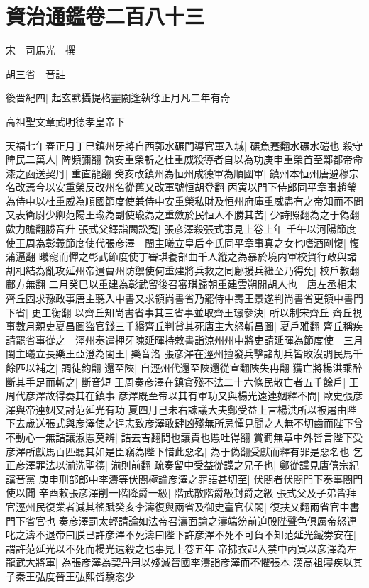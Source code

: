 \chapter{資治通鑑卷二百八十三}
宋　司馬光　撰

胡三省　音註

後晋紀四|{
	起玄黓攝提格盡閼逢執徐正月凡二年有奇}


高祖聖文章武明德孝皇帝下

天福七年春正月丁巳鎮州牙將自西郭水碾門導官軍入城|{
	碾魚蹇翻水碾水磑也}
殺守陴民二萬人|{
	陴頻彌翻}
執安重榮斬之杜重威殺導者自以為功庚申重榮首至鄴都帝命漆之函送契丹|{
	重直龍翻}
癸亥改鎮州為恒州成德軍為順國軍|{
	鎮州本恒州唐避穆宗名改焉今以安重榮反改州名從舊又改軍號恒胡登翻}
丙寅以門下侍郎同平章事趙瑩為侍中以杜重威為順國節度使兼侍中安重榮私財及恒州府庫重威盡有之帝知而不問又表衛尉少卿范陽王瑜為副使瑜為之重斂於民恒人不勝其苦|{
	少詩照翻為之于偽翻歛力贍翻勝音升}
張式父鐸詣闕訟寃|{
	張彦澤殺張式事見上卷上年}
壬午以河陽節度使王周為彰義節度使代張彦澤　閩主曦立皇后李氏同平章事真之女也嗜酒剛愎|{
	愎蒲逼翻}
曦寵而憚之彰武節度使丁審琪養部曲千人縱之為暴於境内軍校賀行政與諸胡相結為亂攻延州帝遣曹州防禦使何重建將兵救之同鄜援兵繼至乃得免|{
	校戶教翻鄜方無翻}
二月癸巳以重建為彰武留後召審琪歸朝重建雲朔閒胡人也　唐左丞相宋齊丘固求豫政事唐主聽入中書又求領尚書省乃罷侍中壽王景遂判尚書省更領中書門下省|{
	更工衡翻}
以齊丘知尚書省事其三省事並取齊王璟參決|{
	所以制宋齊丘}
齊丘視事數月親吏夏昌圖盜官錢三千緡齊丘判貸其死唐主大怒斬昌圖|{
	夏戶雅翻}
齊丘稱疾請罷省事從之　涇州奏遣押牙陳延暉持敕書詣涼州州中將吏請延暉為節度使　三月閩主曦立長樂王亞澄為閩王|{
	樂音洛}
張彦澤在涇州擅發兵擊諸胡兵皆敗沒調民馬千餘匹以補之|{
	調徒釣翻}
還至陜|{
	自涇州代還至陜還從宣翻陜失冉翻}
獲亡將楊洪乘醉斷其手足而斬之|{
	斷音短}
王周奏彦澤在鎮貪殘不法二十六條民散亡者五千餘戶|{
	王周代彦澤故得奏其在鎮事}
彦澤既至帝以其有軍功又與楊光遠連姻釋不問|{
	歐史張彦澤與帝連姻又討范延光有功}
夏四月己未右諫議大夫鄭受益上言楊洪所以被屠由陛下去歲送張式與彦澤使之逞志致彦澤敢肆凶殘無所忌憚見聞之人無不切齒而陛下曾不動心一無詰讓淑慝莫辨|{
	詰去吉翻問也讓責也慝吐得翻}
賞罰無章中外皆言陛下受彦澤所獻馬百匹聽其如是臣竊為陛下惜此惡名|{
	為于偽翻受獻而釋有罪是惡名也}
乞正彦澤罪法以湔洗聖德|{
	湔則前翻}
疏奏留中受益從讜之兄子也|{
	鄭從讜見唐僖宗紀讜音黨}
庚申刑部郎中李濤等伏閤極論彦澤之罪語甚切至|{
	伏閤者伏閤門下奏事閤門使以聞}
辛酉敕張彦澤削一階降爵一級|{
	階武散階爵級封爵之級}
張式父及子弟皆拜官涇州民復業者減其徭賦癸亥李濤復與兩省及御史臺官伏閤|{
	復扶又翻兩省官中書門下省官也}
奏彦澤罰太輕請論如法帝召濤面諭之濤端笏前迫殿陛聲色俱厲帝怒連叱之濤不退帝曰朕已許彦澤不死濤曰陛下許彦澤不死不可負不知范延光鐵劵安在|{
	謂許范延光以不死而楊光遠殺之也事見上卷五年}
帝拂衣起入禁中丙寅以彦澤為左龍武大將軍|{
	為張彦澤為契丹用以殘滅晉國李濤詣彦澤而不懼張本}
漢高祖寢疾以其子秦王弘度晉王弘熙皆驕恣少

